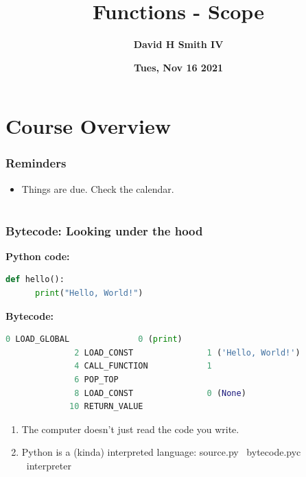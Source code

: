 \documentclass{beamer}
\title{\textbf{Functions - Scope}}
\author{\textbf{David H Smith IV}}
\institute[\textbf{UIUC}]{\textbf{University of Illinois Urbana-Champaign}}
\date{\textbf{Tues, Nov 16 2021}}
\begin{document}
\frame{\titlepage}

\section{Course Overview}

%
%
\begin{frame}
  \frametitle{Reminders}
  \begin{itemize}
    \item Things are due. Check the calendar.
  \end{itemize}
\end{frame}

\section{}

%
%
\begin{frame}[fragile]
  \frametitle{Bytecode: Looking under the hood}
  \textbf{Python code:}\\
  \begin{lstlisting}[language=Python, autogobble]
  def hello():
      print("Hello, World!")
  \end{lstlisting}
  \vfill
  \textbf{Bytecode:}\\
  \begin{lstlisting}[language=Python, autogobble]
              0 LOAD_GLOBAL              0 (print)
              2 LOAD_CONST               1 ('Hello, World!')
              4 CALL_FUNCTION            1
              6 POP_TOP
              8 LOAD_CONST               0 (None)
             10 RETURN_VALUE
  \end{lstlisting}
  \vfill
  \begin{enumerate}[A]
    \item The computer doesn't just read the code you write.
      \pause
    \item Python is a (kinda) interpreted language: source.py \textrightarrow \ bytecode.pyc \textrightarrow \ interpreter
      \pause
  \end{enumerate}
\end{frame}
\end{document}
